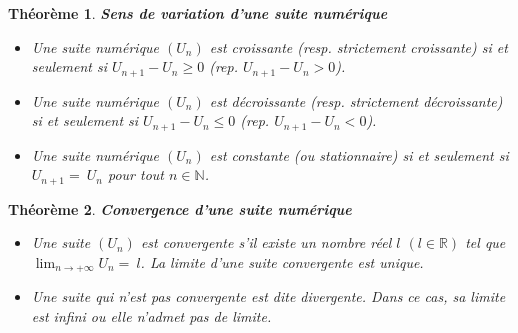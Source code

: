 \documentclass[a4paper, 12pt]{report}
\newtheorem{theoreme}{Théorème}[section]
\begin{document}
    \begin{theoreme} \textbf{Sens de variation d'une suite numérique}
        \begin{itemize}
            \item Une suite numérique $(U_n)$ est croissante (resp. strictement croissante) si et seulement si $U_{n+1}-U_n\geq 0$ (rep. $U_{n+1}-U_n>0$).
            \item Une suite numérique $(U_n)$ est décroissante (resp. strictement décroissante) si et seulement si $U_{n+1}-U_n\leq 0$ (rep. $U_{n+1}-U_n<0$).
            \item Une suite numérique $(U_n)$ est constante (ou stationnaire) si et seulement si $U_{n+1}=~U_n$ pour tout $ n\in\mathbb{N}$.
        \end{itemize}
    \end{theoreme}
    \begin{theoreme} \textbf{Convergence d'une suite numérique}
        \begin{itemize}
            \item Une suite $(U_n)$ est convergente s'il existe un nombre réel $l$ $(l\in\mathbb{R})$ tel que $\lim_{n \to +\infty}U_n=~l$. La limite d'une suite 
            convergente est unique.
            \item Une suite qui n'est pas convergente est dite divergente. Dans ce cas, sa limite est infini ou elle n'admet pas de limite.
        \end{itemize}
    \end{theoreme}
\end{document}
